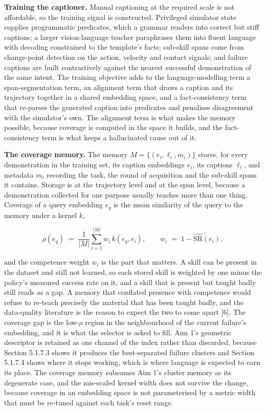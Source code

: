 \documentclass[
  11pt,
]{article}
\begin{document}
\textbf{Training the captioner.} Manual captioning at the required scale
is not affordable, so the training signal is constructed. Privileged
simulator state supplies programmatic predicates, which a grammar
renders into correct but stiff captions; a larger vision-language
teacher paraphrases them into fluent language with decoding constrained
to the template's facts; sub-skill spans come from change-point
detection on the action, velocity and contact signals; and failure
captions are built contrastively against the nearest successful
demonstration of the same intent. The training objective adds to the
language-modelling term a span-segmentation term, an alignment term that
draws a caption and its trajectory together in a shared embedding space,
and a fact-consistency term that re-parses the generated caption into
predicates and penalises disagreement with the simulator's own. The
alignment term is what makes the memory possible, because coverage is
computed in the space it builds, and the fact-consistency term is what
keeps a hallucinated cause out of it.

\textbf{The coverage memory.} The memory \(M = \{(e_i, \ell_i, m_i)\}\)
stores, for every demonstration in the training set, its caption
embeddings \(e_i\), its captions \(\ell_i\), and metadata \(m_i\)
recording the task, the round of acquisition and the sub-skill spans it
contains. Storage is at the trajectory level and at the span level,
because a demonstration collected for one purpose usually teaches more
than one thing. Coverage of a query embedding \(e_q\) is the mean
similarity of the query to the memory under a kernel \(k\),

\[\rho(e_q) \;=\; \frac{1}{|M|} \sum_{i=1}^{|M|} w_i \, k(e_q, e_i), \qquad w_i \;=\; 1 - \widehat{\text{SR}}(e_i), \tag{13}\]

and the competence weight \(w_i\) is the part that matters. A skill can
be present in the dataset and still not learned, so each stored skill is
weighted by one minus the policy's measured success rate on it, and a
skill that is present but taught badly still reads as a gap. A memory
that conflated presence with competence would refuse to re-teach
precisely the material that has been taught badly, and the data-quality
literature is the reason to expect the two to come apart {[}6{]}. The
coverage gap is the low-\(\rho\) region in the neighbourhood of the
current failure's embedding, and it is what the selector is asked to
fill. Aim 1's geometric descriptor is retained as one channel of the
index rather than discarded, because Section 5.1.7.3 shows it produces
the best-separated failure clusters and Section 5.1.7.4 shows where it
stops working, which is where language is expected to earn its place.
The coverage memory subsumes Aim 1's cluster memory as its degenerate
case, and the mis-scaled kernel width does not survive the change,
because coverage in an embedding space is not parameterised by a metric
width that must be re-tuned against each task's reset range.
\end{document}
